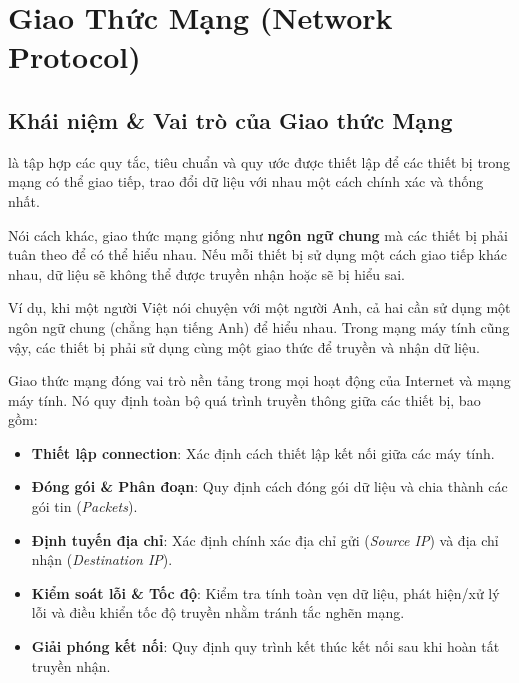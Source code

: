\section{Giao Thức Mạng (Network Protocol)}
\label{sec:protocols}

\subsection{Khái niệm \& Vai trò của Giao thức Mạng}

 là tập hợp các quy tắc, tiêu chuẩn và quy ước được thiết lập để các thiết bị trong mạng có thể giao tiếp, trao đổi dữ liệu với nhau một cách chính xác và thống nhất.

Nói cách khác, giao thức mạng giống như \textbf{ngôn ngữ chung} mà các thiết bị phải tuân theo để có thể hiểu nhau. Nếu mỗi thiết bị sử dụng một cách giao tiếp khác nhau, dữ liệu sẽ không thể được truyền nhận hoặc sẽ bị hiểu sai.

Ví dụ, khi một người Việt nói chuyện với một người Anh, cả hai cần sử dụng một ngôn ngữ chung (chẳng hạn tiếng Anh) để hiểu nhau. Trong mạng máy tính cũng vậy, các thiết bị phải sử dụng cùng một giao thức để truyền và nhận dữ liệu.

Giao thức mạng đóng vai trò nền tảng trong mọi hoạt động của Internet và mạng máy tính. Nó quy định toàn bộ quá trình truyền thông giữa các thiết bị, bao gồm:
\begin{itemize}[leftmargin=2.2em, itemsep=2pt, parsep=0pt]
    \item \textbf{Thiết lập connection}: Xác định cách thiết lập kết nối giữa các máy tính.
    \item \textbf{Đóng gói \& Phân đoạn}: Quy định cách đóng gói dữ liệu và chia thành các gói tin (\textit{Packets}).
    \item \textbf{Định tuyến địa chỉ}: Xác định chính xác địa chỉ gửi (\textit{Source IP}) và địa chỉ nhận (\textit{Destination IP}).
    \item \textbf{Kiểm soát lỗi \& Tốc độ}: Kiểm tra tính toàn vẹn dữ liệu, phát hiện/xử lý lỗi và điều khiển tốc độ truyền nhằm tránh tắc nghẽn mạng.
    \item \textbf{Giải phóng kết nối}: Quy định quy trình kết thúc kết nối sau khi hoàn tất truyền nhận.
\end{itemize}


